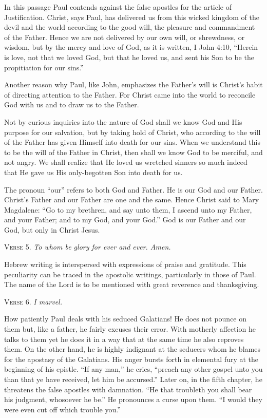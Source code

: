 In this passage Paul contends against the false apostles for the article of Justification. Christ, says Paul, has delivered us from this wicked kingdom of the devil and the world according to the good will, the pleasure and commandment of the Father. Hence we are not delivered by our own will, or shrewdness, or wisdom, but by the mercy and love of God, as it is written, I John 4:10, “Herein is love, not that we loved God, but that he loved us, and sent his Son to be the propitiation for our sins.”

Another reason why Paul, like John, emphasizes the Father’s will is Christ’s habit of directing attention to the Father. For Christ came into the world to reconcile God with us and to draw us to the Father.

Not by curious inquiries into the nature of God shall we know God and His purpose for our salvation, but by taking hold of Christ, who according to the will of the Father has given Himself into death for our sins. When we understand this to be the will of the Father in Christ, then shall we know God to be merciful, and not angry. We shall realize that He loved us wretched sinners so much indeed that He gave us His only-begotten Son into death for us.

The pronoun “our” refers to both God and Father. He is our God and our Father. Christ’s Father and our Father are one and the same. Hence Christ said to Mary Magdalene: “Go to my brethren, and say unto them, I ascend unto my Father, and your Father; and to my God, and your God.” God is our Father and our God, but only in Christ Jesus.

\textsc{Verse} 5. \emph{To whom be glory for ever and ever. Amen.}

Hebrew writing is interspersed with expressions of praise and gratitude. This peculiarity can be traced in the apostolic writings, particularly in those of Paul. The name of the Lord is to be mentioned with great reverence and thanksgiving.

\textsc{Verse} 6. \emph{I marvel.}

How patiently Paul deals with his seduced Galatians! He does not pounce on them but, like a father, he fairly excuses their error. With motherly affection he talks to them yet he does it in a way that at the same time he also reproves them. On the other hand, he is highly indignant at the seducers whom he blames for the apostasy of the Galatians. His anger bursts forth in elemental fury at the beginning of his epistle. “If any man,” he cries, “preach any other gospel unto you than that ye have received, let him be accursed.” Later on, in the fifth chapter, he threatens the false apostles with damnation. “He that troubleth you shall bear his judgment, whosoever he be.” He pronounces a curse upon them. “I would they were even cut off which trouble you.”

